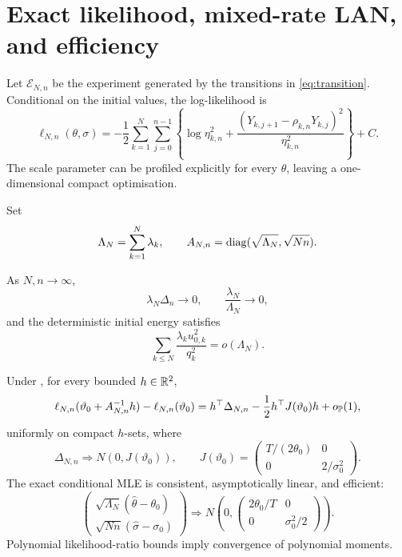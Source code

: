 \section{Exact likelihood, mixed-rate LAN, and efficiency}\label{sec:lan}

Let $\mathcal E_{N,n}$ be the experiment generated by the transitions in \eqref{eq:transition}. Conditional on the initial values, the log-likelihood is
\[
 \ell_{N,n}(\theta,\sigma)
 =-\frac12\sum_{k=1}^N\sum_{j=0}^{n-1}
 \left\{
 \log\eta_{k,n}^2
 +\frac{(Y_{k,j+1}-\rho_{k,n}Y_{k,j})^2}{\eta_{k,n}^2}
 \right\}+C.
\]
The scale parameter can be profiled explicitly for every $\theta$, leaving a one-dimensional compact optimisation.

Set
\[
 \Lambda_N=\sum_{k=1}^N\lambda_k,
 \qquad
 A_{N,n}=\operatorname{diag}(\sqrt{\Lambda_N},\sqrt{Nn}).
\]

\begin{assumption}\label{ass:regime}
As $N,n\to\infty$,
\[
 \lambda_N\Delta_n\to0,
 \qquad
 \frac{\lambda_N}{\Lambda_N}\to0,
\]
and the deterministic initial energy satisfies
\[
 \sum_{k\le N}\frac{\lambda_ku_{0,k}^2}{q_k^2}=o(\Lambda_N).
\]
\end{assumption}

\begin{theorem}\label{thm:lan}
Under , for every bounded $h\in\mathbb R^2$,
\[
 \ell_{N,n}(\vartheta_0+A_{N,n}^{-1}h)-\ell_{N,n}(\vartheta_0)
 =h^\top\Delta_{N,n}-\frac12h^\top J(\vartheta_0)h+o_{\mathbb P}(1),
\]
uniformly on compact $h$-sets, where
\[
 \Delta_{N,n}\Rightarrow N(0,J(\vartheta_0)),
 \qquad
 J(\vartheta_0)=
 \begin{pmatrix}
 T/(2\theta_0)&0\\
 0&2/\sigma_0^2
 \end{pmatrix}.
\]
The exact conditional MLE is consistent, asymptotically linear, and efficient:
\[
 \begin{pmatrix}
 \sqrt{\Lambda_N}(\widehat\theta-\theta_0)\\
 \sqrt{Nn}(\widehat\sigma-\sigma_0)
 \end{pmatrix}
 \Rightarrow
 N\left(
 0,
 \begin{pmatrix}
 2\theta_0/T&0\\
 0&\sigma_0^2/2
 \end{pmatrix}
 \right).
\]
Polynomial likelihood-ratio bounds imply convergence of polynomial moments.
\end{theorem}


